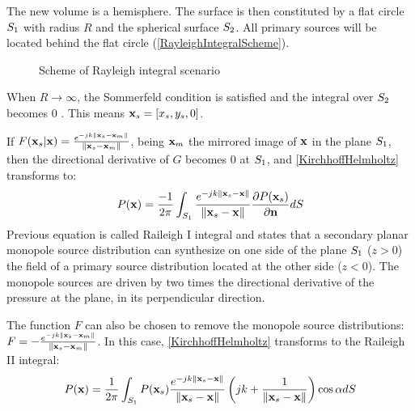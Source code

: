The new volume is a hemisphere. The surface is then constituted by a flat circle $S_1$ with radius $R$ and the spherical surface $S_2$. All primary sources will be located behind the flat circle (\autoref{RayleighIntegralScheme}).
\begin{figure}[h]
	\centering
	\def\svgwidth{0.6\columnwidth}
	\graphicspath{{../TFM/Img/}}
	
	\caption{Scheme of Rayleigh integral scenario}
	\label{RayleighIntegralScheme}
\end{figure}
When $R\rightarrow\infty$, the Sommerfeld condition is satisfied and the integral over $S_2$ becomes $0$ \cite{Verheijen}. This means $\PosTheo[surface] = [\PosTheo[surface][x], \PosTheo[surface][y], 0]$.

If $F(\PosTheo[surface] \vert \PosTheo) = \GreenFunc[ {\PosTheo[surface] - \PosTheo[mirrored]} ]$, being $\PosTheo[mirrored]$ the mirrored image of $\PosTheo$ in the plane $S_1$, then the directional derivative of $G$ becomes $0$ at $S_1$, and \autoref{KirchhoffHelmholtz} transforms to:
\begin{equation}
P(\PosTheo) = \frac{-1}{2\pi} \int_{\surfaceTheoRayleighPlane} \GreenFunc[{\PosTheo[surface] - \PosTheo}] \frac{\partial P(\PosTheo[surface])}{\partial \mathbf{n}} dS
\label{RayleighI}
\end{equation}
Previous equation is called Raileigh I integral and states that a secondary planar monopole source distribution can synthesize on one side of the plane $S_1$ ($z>0$) the field of a primary source distribution located at the other side ($z<0$). The monopole sources are driven by two times the directional derivative of the pressure at the plane, in its perpendicular direction.

The function $F$ can also be chosen to remove the monopole source distributions: $F = -\GreenFunc[ {\PosTheo[surface] - \PosTheo[mirrored]} ]$. In this case, \autoref{KirchhoffHelmholtz} transforms to the Raileigh II integral:
\begin{equation}
P(\PosTheo) = \frac{1}{2\pi} \int_{\surfaceTheoRayleighPlane} P(\PosTheo[surface]) \GreenFunc[{\PosTheo[surface] - \PosTheo}] \left(jk + \frac{1}{\norm{\PosTheo[surface] - \PosTheo}}\right)\cos\normSecondPropAngle dS
\label{RayleighII}
\end{equation}

